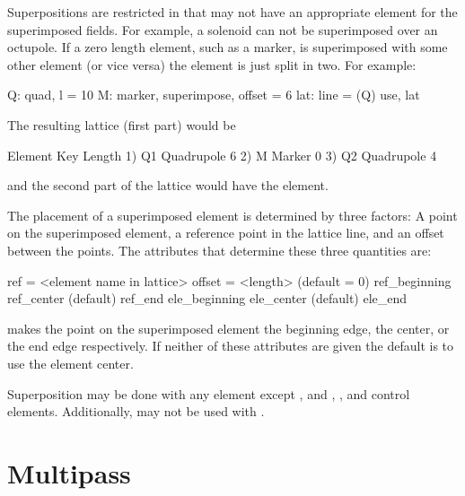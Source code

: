 Superpositions are restricted in that \bmad may not have an
appropriate element for the superimposed fields. For example, a
solenoid can not be superimposed over an octupole.  If a zero length
element, such as a marker, is superimposed with some other element (or
vice versa) the element is just split in two. For example:
\begin{example}
  Q: quad, l = 10
  M: marker, superimpose, offset = 6
  lat: line = (Q)
  use, lat
\end{example}
The resulting lattice (first part) would be
\begin{example}
        Element   Key           Length
  1)    Q{\B}1       Quadrupole    6
  2)    M         Marker        0
  3)    Q{\B}2       Quadrupole    4
\end{example}
and the second part of the lattice would have the  element.
 
The placement of a superimposed element is determined by three
factors: A point on the superimposed element, a reference point in the
lattice line, and an offset between the points. The attributes that
determine these three quantities are:
\begin{example}
  ref = <element name in lattice>
  offset = <length>      (default = 0)
  ref_beginning
  ref_center             (default)
  ref_end
  ele_beginning
  ele_center             (default)
  ele_end
\end{example}
   makes the point on the
superimposed element the beginning edge, the center, or the
end edge respectively. If neither of these attributes are
given the default is to use the element center.

Superposition may be done with any element except ,
and , , and  control elements.
Additionally,  may not be used with .

\section{Multipass}
\label{s:multipass}

